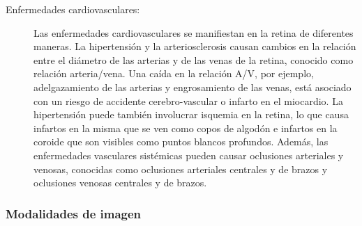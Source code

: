 \begin{description}
     \item[Enfermedades cardiovasculares:] Las enfermedades cardiovasculares se manifiestan en la retina de diferentes maneras. La hipertensión y la arteriosclerosis causan cambios en la relación entre el diámetro de las arterias y de las venas de la retina, conocido como relación arteria/vena. Una caída en la relación A/V, por ejemplo, adelgazamiento de las arterias y engrosamiento de las venas, está asociado con un riesgo de accidente cerebro-vascular o infarto en el miocardio. La hipertensión puede también involucrar isquemia en la retina, lo que causa infartos en la misma que se ven como copos de algodón e infartos en la coroide que son visibles como puntos blancos profundos. Además, las enfermedades vasculares sistémicas pueden causar oclusiones arteriales y venosas, conocidas como oclusiones arteriales centrales y de brazos y oclusiones venosas centrales y de brazos. \cite{fraz2012blood}
\end{description}






			\subsubsection{Modalidades de imagen}




